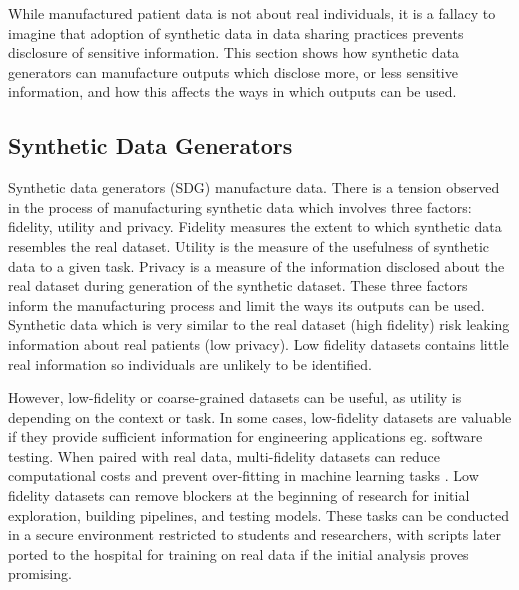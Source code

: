 \documentclass[11pt]{article}
\begin{document}
While manufactured patient data is not about real individuals, it is a fallacy to imagine that adoption of synthetic data in data sharing practices prevents disclosure of sensitive information. This section shows how synthetic data generators can manufacture outputs which disclose more, or less sensitive information, and how this affects the ways in which outputs can be used.

\subsection{Synthetic Data Generators}


Synthetic data generators (SDG) manufacture data. There is a tension observed in the process of manufacturing synthetic data which involves three factors: fidelity, utility and privacy. Fidelity measures the extent to which synthetic data resembles the real dataset. Utility is the measure of the usefulness of synthetic data to a given task. Privacy is a measure of the information disclosed about the real dataset during generation of the synthetic dataset. These three factors inform the manufacturing process and limit the ways its outputs can be used. Synthetic data which is very similar to the real dataset (high fidelity) risk leaking information about real patients (low privacy). Low fidelity datasets contains little real information so individuals are unlikely to be identified. 

However, low-fidelity or coarse-grained datasets can be useful, as utility is depending on the context or task. In some cases, low-fidelity datasets are valuable if they provide sufficient information for engineering applications eg. software testing. When paired with real data, multi-fidelity datasets can  reduce computational costs and prevent over-fitting in machine learning tasks \cite{Patra2020}\cite{Santoni2024}\cite{berkson2019}. Low fidelity datasets can remove blockers at the beginning of research for initial exploration, building pipelines, and testing models. These tasks can be conducted in a secure environment restricted to students and researchers, with scripts later ported to the hospital for training on real data if the initial analysis proves promising.
\end{document}

